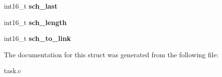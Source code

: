 \begin{DoxyCompactItemize}
\item 
\hypertarget{structtask__queue__t_a6f4f046622b65441cc3ec638a8cef511}{int16\+\_\+t {\bfseries sch\+\_\+last}}\label{structtask__queue__t_a6f4f046622b65441cc3ec638a8cef511}

\item 
\hypertarget{structtask__queue__t_a4065929a47f148695a559302067cc65b}{int16\+\_\+t {\bfseries sch\+\_\+length}}\label{structtask__queue__t_a4065929a47f148695a559302067cc65b}

\item 
\hypertarget{structtask__queue__t_ab327dca238f978943933492560a43bf2}{int16\+\_\+t {\bfseries sch\+\_\+to\+\_\+link}}\label{structtask__queue__t_ab327dca238f978943933492560a43bf2}

\end{DoxyCompactItemize}


The documentation for this struct was generated from the following file\+:\begin{DoxyCompactItemize}
\item 
task.\+c\end{DoxyCompactItemize}
